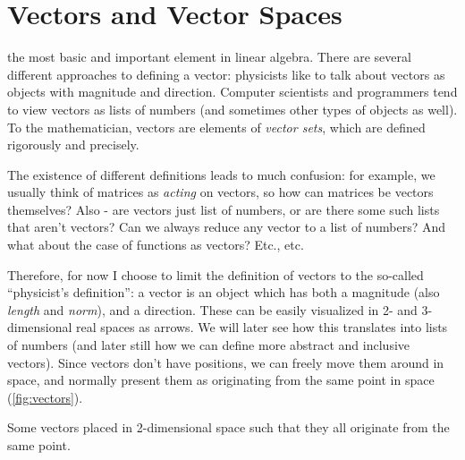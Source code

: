 \section{Vectors and Vector Spaces}
the most basic and important element in linear algebra. There are several different approaches to defining a vector: physicists like to talk about vectors as objects with magnitude and direction. Computer scientists and programmers tend to view vectors as lists of numbers (and sometimes other types of objects as well). To the mathematician, vectors are elements of \textit{vector sets}, which are defined rigorously and precisely.

The existence of different definitions leads to much confusion: for example, we usually think of matrices as \textit{acting} on vectors, so how can matrices be vectors themselves? Also - are vectors just list of numbers, or are there some such lists that aren't vectors? Can we always reduce any vector to a list of numbers? And what about the case of functions as vectors? Etc., etc.

Therefore, for now I choose to limit the definition of vectors to the so-called \enquote{physicist's definition}: a vector is an object which has both a magnitude (also \textit{length} and \textit{norm}), and a direction. These can be easily visualized in 2- and 3-dimensional real spaces as arrows. We will later see how this translates into lists of numbers (and later still how we can define more abstract and inclusive vectors). Since vectors don't have positions, we can freely move them around in space, and normally present them as originating from the same point in space (\cref{fig:vectors}).

\begin{marginfigure}
    \caption{Some vectors placed in 2-dimensional space such that they all originate from the same point.}
    \label{fig:vectors}
\end{marginfigure}

